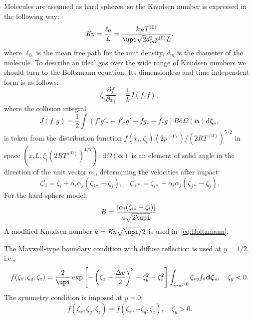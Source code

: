 \documentclass[]{jfm}
\newcommand{\Kn}{\mbox{\textit{Kn}}}
\newcommand{\dd}{\mathrm{d}}
\newcommand{\pder}[2][]{\frac{\partial#1}{\partial#2}}
\newcommand{\dzeta}{\boldsymbol{\dd\zeta}}
\begin{document}
Molecules are assumed as hard spheres, so the Knudsen number is expressed in the following way:
\begin{equation}\label{eq:Kn_number}
    \Kn = \frac{\ell_0}{L} = \frac{k_BT^{(0)}}{\upi\sqrt{2} d_m^2p^{(0)}L},
\end{equation}
where \(\ell_0\) is the mean free path for the unit density, \(d_m\) is the diameter of the molecule.
To describe an ideal gas over the wide range of Knudsen numbers
we should turn to the Boltzmann equation.
Its dimensionless and time-independent form is as follows:
\begin{equation}\label{eq:Boltzmann}
    \zeta_i\pder[f]{x_i} = \frac1k J(f,f),
\end{equation}
where the collision integral
\begin{equation}\label{eq:ci}
    J(f,g) = \frac12 \int (f'g'_* + f'_*g' - fg_* - f_*g) B
    \dd \Omega(\boldsymbol{\alpha}) \dzeta_*,
\end{equation}
is taken from the distribution function \(f(x_i,\zeta_i)(2p^{(0)})/(2RT^{(0)})^{5/2}\)
in space \((x_iL, \zeta_i(2RT^{(0)})^{1/2})\).
\(\dd \Omega(\boldsymbol{\alpha})\) is an element of solid angle in the direction of the unit vector \(\alpha_i\),
determining the velocities after impact:
\begin{equation}\label{eq:after_impact}
    \zeta'_i = \zeta_i + \alpha_i\alpha_j(\zeta_{j*}-\zeta_j), \quad
    \zeta'_{i*} = \zeta_{i*} - \alpha_i\alpha_j(\zeta_{j*}-\zeta_j).
\end{equation}
For the hard-sphere model,
\begin{equation}\label{eq:ci_kernel}
    B = \frac{|\alpha_i(\zeta_{i*}-\zeta_i)|}{4\sqrt{2\upi}}.
\end{equation}
A modified Knudsen number \(k = \Kn\sqrt{\upi}/2\) is used in~\eqref{eq:Boltzmann}.

The Maxwell-type boundary condition with diffuse reflection is used at \(y=1/2\), i.e.,
\begin{equation}\label{eq:diffuse_bc}
    f(\zeta_x,\zeta_y,\zeta_z) = \frac2{\upi} \exp\left[-\left(\zeta_x-\frac{\Delta{v}}{2}\right)^2-\zeta_y^2-\zeta_z^2\right]
        \int_{\zeta_{*y}>0}\zeta_{*y} f_* \dzeta_*, \quad \zeta_y<0.
\end{equation}
The symmetry condition is imposed at \(y=0\):
\begin{equation}\label{eq:specular_bc}
    f(\zeta_x,\zeta_y,\zeta_z) = f(\zeta_x,-\zeta_y,\zeta_z), \quad \zeta_y>0.
\end{equation}
\end{document}
